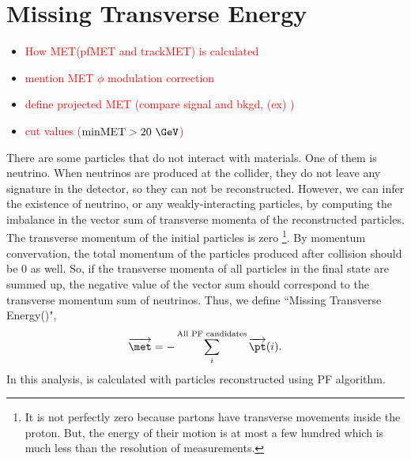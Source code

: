 \section{ Missing Transverse Energy }
\begin{itemize}
\item \textcolor{red}{How MET(pfMET and trackMET) is calculated } 
\item \textcolor{red}{mention MET $\phi$ modulation correction }
\item \textcolor{red}{define projected MET (compare signal and bkgd, (ex) \ztt)}
\item \textcolor{red}{cut values ($\textrm{minMET} > 20~\GeV$) }
\end{itemize}
There are some particles that do not interact with materials. One of them is neutrino.
When neutrinos are produced at the collider, they do not leave any signature 
in the detector, so they can not be reconstructed. However, we can infer 
the existence of neutrino, or any weakly-interacting particles, by computing 
the imbalance in the vector sum of transverse momenta of the reconstructed particles.
The transverse momentum of the initial particles is zero 
\footnote{It is not perfectly zero because partons have transverse movements 
inside the proton. But, the energy of their motion is at most a few hundred \MeV{}
which is much less than the resolution of measurements.}.
By momentum convervation, the total momentum of the particles produced 
after collision should be 0 as well. 
So, if the transverse momenta of all particles in the final state are summed up, 
the negative value of the vector sum should correspond to the transverse momentum 
sum of neutrinos. Thus, we define ``Missing Transverse Energy(\met)", 
\begin{eqnarray} 
\overrightarrow{\met} = - \sum^{\textrm{All PF candidates}}_i \overrightarrow{\pt}(i).
\end{eqnarray} 
In this analysis, \met{} is calculated with particles reconstructed using PF algorithm.

